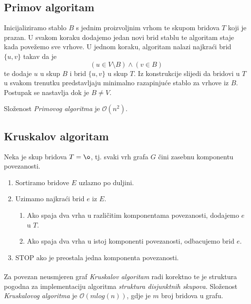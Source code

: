 \documentclass[a4paper,12pt]{article}
\begin{document}
\newpage
\subsection{Primov algoritam}

Inicijaliziramo stablo $B$ s jednim proizvoljnim vrhom te skupom bridova $T$ koji je prazan.
U svakom koraku dodajemo jedan novi brid stablu te algoritam staje kada pove\v{z}emo sve vrhove.
U jednom koraku, algoritam nalazi najkra\'ci brid $ \{ u, v \} $ takav da je 
\begin{equation}
 (u \in V \setminus B)  \land  (v \in B)
\end{equation}
te dodaje $u$ u skup $B$ i brid $\{ u, v \} $ u skup $T$. Iz konstrukcije slijedi da bridovi u $T$ u svakom trenutku predstavljaju minimalno razapinju\'ce stablo za vrhove iz $B$.
Postupak se nastavlja dok je $B \ne V$.

Slo\v{z}enost \emph{Primovog algoritma} je $ \mathcal{O} (n^2)$.

\subsection{Kruskalov algoritam}


Neka je skup bridova $T= \o$, tj. svaki vrh grafa $G$ \v{c}ini zasebnu komponentu povezanosti. 

\begin{enumerate}
	\item Sortiramo bridove $E$ uzlazno po duljini.
	\item Uzimamo najkra\'ci brid $e$ iz $E$.
	\begin{enumerate}
		\item Ako spaja dva vrha u razli\v{c}itim komponentama povezanosti, dodajemo $e$ u $T$.
		\item Ako spaja dva vrha u istoj komponenti povezanosti, odbacujemo brid $e$.
	\end{enumerate}
	\item STOP ako je preostala jedna komponenta povezanosti.
\end{enumerate}

\paragraph{}
Za povezan neusmjeren graf \emph{Kruskalov algoritam} radi korektno te je struktura pogodna za implementaciju algoritma \emph{struktura disjunktnih skupova}. Slo\v{z}enost \emph{Kruskalovog algoritma} je $ \mathcal{O} (m   log(n))$, gdje je $m$ broj bridova u grafu. 
\end{document}
